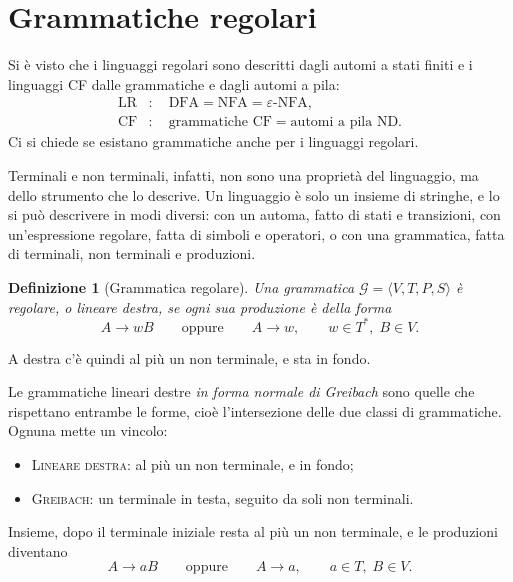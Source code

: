\documentclass[a4paper, 11pt, oneside]{book}
\theoremstyle{formale}
\newtheorem*{definition}{Definizione}
\begin{document}
    \section{Grammatiche regolari}
    \label{sec:grammatiche-regolari}
    Si \`e visto che i linguaggi regolari sono descritti dagli automi a stati finiti e i
    linguaggi CF dalle grammatiche e dagli automi a pila:
    \begin{align*}
        \mathrm{LR} &: \quad \text{DFA} = \text{NFA} = \varepsilon\text{-NFA}, \\
        \text{CF} &: \quad \text{grammatiche CF} = \text{automi a pila ND}.
    \end{align*}
    Ci si chiede se esistano grammatiche anche per i linguaggi regolari.

    Terminali e non terminali, infatti, non sono una propriet\`a del linguaggio, ma dello
    strumento che lo descrive. Un linguaggio \`e solo un insieme di stringhe, e lo si
    pu\`o descrivere in modi diversi: con un automa, fatto di stati e transizioni, con
    un'espressione regolare, fatta di simboli e operatori, o con una grammatica, fatta di
    terminali, non terminali e produzioni.

    \begin{definition}[Grammatica regolare]
        Una grammatica $\mathcal{G} = \langle V, T, P, S \rangle$ \`e \emph{regolare}, o
        \emph{lineare destra}, se ogni sua produzione \`e della forma
        \begin{equation*}
            A \to wB \qquad \text{oppure} \qquad A \to w,
            \qquad w \in T^*,\; B \in V.
        \end{equation*}
    \end{definition}
    A destra c'\`e quindi al pi\`u un non terminale, e sta in fondo.

    Le grammatiche lineari destre \emph{in forma normale di Greibach} sono quelle che
    rispettano entrambe le forme, cio\`e l'intersezione delle due classi di grammatiche.
    Ognuna mette un vincolo:
    \begin{itemize}
        \item \textsc{Lineare destra}: al pi\`u un non terminale, e in fondo;
        \item \textsc{Greibach}: un terminale in testa, seguito da soli non terminali.
    \end{itemize}
    Insieme, dopo il terminale iniziale resta al pi\`u un non terminale, e le produzioni
    diventano
    \begin{equation*}
        A \to aB \qquad \text{oppure} \qquad A \to a,
        \qquad a \in T,\; B \in V.
    \end{equation*}
\end{document}
